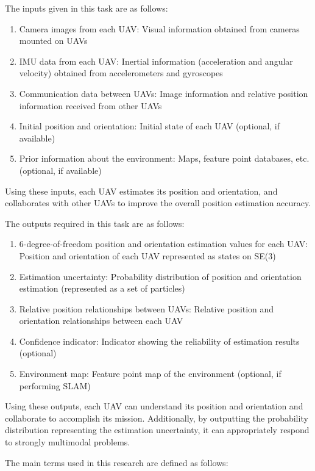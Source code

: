 \documentclass[a4paper,fleqn,10pt,twocolumn]{SICE_ISCS}
\begin{document}
The inputs given in this task are as follows:

\begin{enumerate}
\item Camera images from each UAV: Visual information obtained from cameras mounted on UAVs
\item IMU data from each UAV: Inertial information (acceleration and angular velocity) obtained from accelerometers and gyroscopes
\item Communication data between UAVs: Image information and relative position information received from other UAVs
\item Initial position and orientation: Initial state of each UAV (optional, if available)
\item Prior information about the environment: Maps, feature point databases, etc. (optional, if available)
\end{enumerate}

Using these inputs, each UAV estimates its position and orientation, and collaborates with other UAVs to improve the overall position estimation accuracy.

The outputs required in this task are as follows:

\begin{enumerate}
\item 6-degree-of-freedom position and orientation estimation values for each UAV: Position and orientation of each UAV represented as states on SE(3)
\item Estimation uncertainty: Probability distribution of position and orientation estimation (represented as a set of particles)
\item Relative position relationships between UAVs: Relative position and orientation relationships between each UAV
\item Confidence indicator: Indicator showing the reliability of estimation results (optional)
\item Environment map: Feature point map of the environment (optional, if performing SLAM)
\end{enumerate}

Using these outputs, each UAV can understand its position and orientation and collaborate to accomplish its mission. Additionally, by outputting the probability distribution representing the estimation uncertainty, it can appropriately respond to strongly multimodal problems.

The main terms used in this research are defined as follows:
\end{document}
